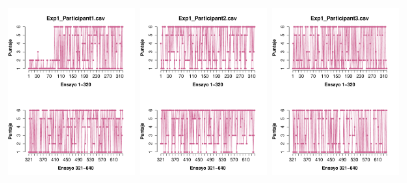 \begin{figure}[th]
\centering
\includegraphics[width=0.30\textwidth]{Figures/Rating_Exp1_P1} \includegraphics[width=0.30\textwidth]{Figures/Rating_Exp1_P2} \includegraphics[width=0.30\textwidth]{Figures/Rating_Exp1_P3}

\end{figure}
